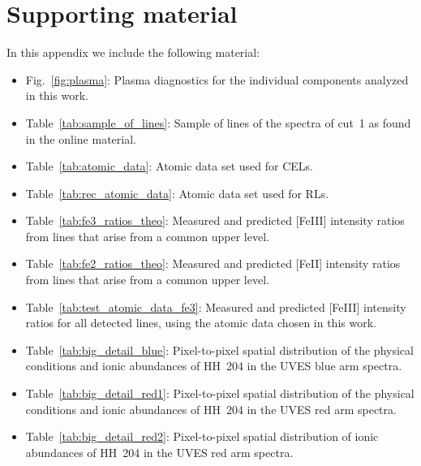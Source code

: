 \documentclass[twocolumn]{aastex63}
\begin{document}
\section{Supporting material}
\label{sec:sup_mat}

In this appendix we include the following material:


\begin{itemize}
    \item Fig.~\ref{fig:plasma}: Plasma diagnostics for the individual components analyzed in this work.
    
    \item Table~\ref{tab:sample_of_lines}: Sample of lines of the spectra of cut~1 as found in the online material.

    \item Table~\ref{tab:atomic_data}: Atomic data set used for CELs.
    
    \item Table~\ref{tab:rec_atomic_data}: Atomic data set used for RLs.
    
    \item Table~\ref{tab:fe3_ratios_theo}: Measured and predicted
    [Fe\thinspace III] intensity ratios from lines that arise from a common upper level. 
    
    \item Table~\ref{tab:fe2_ratios_theo}: Measured and predicted [Fe\thinspace II] intensity ratios from lines that arise from a common upper level. 
    
    \item Table~\ref{tab:test_atomic_data_fe3}: Measured and predicted [Fe\thinspace III] intensity ratios for all detected lines, using the atomic data chosen in this work.
    
    \item Table~\ref{tab:big_detail_blue}: Pixel-to-pixel spatial distribution of the physical conditions and ionic abundances of HH~204 in the UVES blue arm spectra.
    
    \item Table~\ref{tab:big_detail_red1}: Pixel-to-pixel spatial distribution of the physical conditions and ionic abundances of HH~204 in the UVES red arm spectra.

    \item Table~\ref{tab:big_detail_red2}: Pixel-to-pixel spatial distribution of ionic abundances of HH~204 in the UVES red arm spectra.

\end{itemize}
\end{document}
